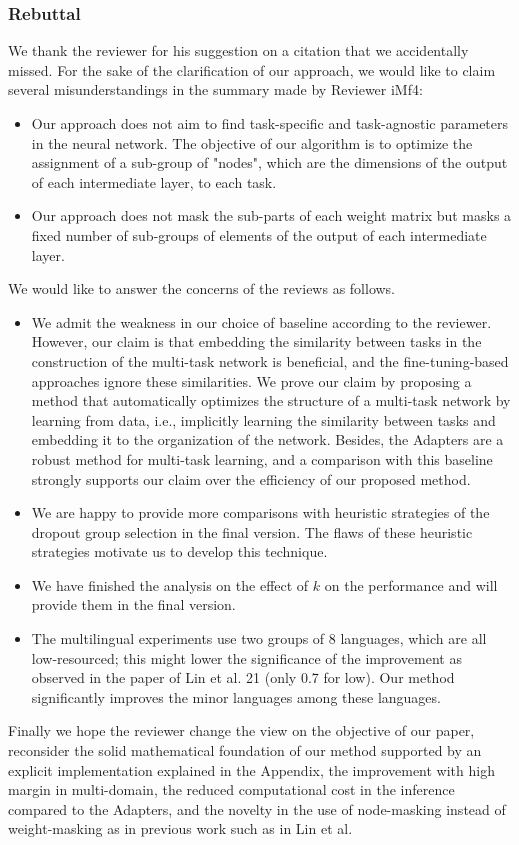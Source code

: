 \documentclass[12pt,times,a4paper,twoside]{article}
\theoremstyle{definition}
\begin{document}
\subsubsection*{Rebuttal}
{\color{blue}%
We thank the reviewer for his suggestion on a citation that we accidentally missed. For the sake of the clarification of our approach, we would like to claim several misunderstandings in the summary made by Reviewer iMf4:
\begin{itemize}
\item Our approach does not aim to find task-specific and task-agnostic parameters in the neural network. The objective of our algorithm is to optimize the assignment of a sub-group of "nodes", which are the dimensions of the output of each intermediate layer, to each task.
\item Our approach does not mask the sub-parts of each weight matrix but masks a fixed number of sub-groups of elements of the output of each intermediate layer.
\end{itemize}
We would like to answer the concerns of the reviews as follows.
\begin{itemize}
\item We admit the weakness in our choice of baseline according to the reviewer. However, our claim is that embedding the similarity between tasks in the construction of the multi-task network is beneficial, and the fine-tuning-based approaches ignore these similarities. We prove our claim by proposing a method that automatically optimizes the structure of a multi-task network by learning from data, i.e., implicitly learning the similarity between tasks and embedding it to the organization of the network. Besides, the Adapters are a robust method for multi-task learning, and a comparison with this baseline strongly supports our claim over the efficiency of our proposed method.
\item We are happy to provide more comparisons with heuristic strategies of the dropout group selection in the final version. The flaws of these heuristic strategies motivate us to develop this technique.
\item We have finished the analysis on the effect of $k$ on the performance and will provide them in the final version.
\item The multilingual experiments use two groups of 8 languages, which are all low-resourced; this might lower the significance of the improvement as observed in the paper of Lin et al. 21 (only 0.7 for low). Our method significantly improves the minor languages among these languages.
\end{itemize}

Finally we hope the reviewer change the view on the objective of our paper, reconsider the solid mathematical foundation of our method supported by an explicit implementation explained in the Appendix, the improvement with high margin in multi-domain, the reduced computational cost in the inference compared to the Adapters, and the novelty in the use of node-masking instead of weight-masking as in previous work such as in Lin et al.}
\end{document}
